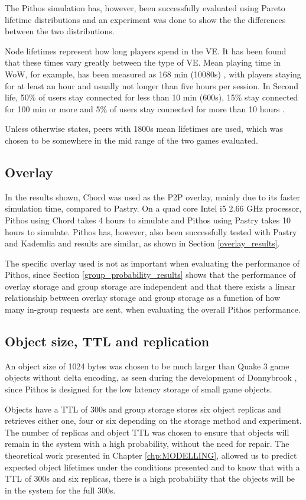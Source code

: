 The Pithos simulation has, however, been successfully evaluated using Pareto lifetime distributions and an experiment was done to show the the differences between the two distributions.

Node lifetimes represent how long players spend in the VE. It has been found that these times vary greatly between the type of VE. Mean playing time in WoW, for example, has been measured as 168 min (10080s) \cite{wow_gameplay_hours}, with players staying for at least an hour and usually not longer than five hours per session. In Second life, 50\% of users stay connected for less than 10 min (600s), 15\% stay connected for 100 min or more and 5\% of users stay connected for more than 10 hours \cite{Varvello_life_in_second_life}.

Unless otherwise states, peers with 1800s mean lifetimes are used, which was chosen to be somewhere in the mid range of the two games evaluated.

\subsection{Overlay}
In the results shown, Chord was used as the P2P overlay, mainly due to its faster simulation time, compared to Pastry. On a quad core Intel i5 2.66 GHz processor, Pithos using Chord takes 4 hours to simulate and Pithos using Pastry takes 10 hours to simulate. Pithos has, however, also been successfully tested with Pastry and Kademlia and results are similar, as shown in Section \ref{overlay_results}.

The specific overlay used is not as important when evaluating the performance of Pithos, since Section \ref{group_probability_results} shows that the performance of overlay storage and group storage are independent and that there exists a linear relationship between overlay storage and group storage as a function of how many in-group requests are sent, when evaluating the overall Pithos performance.

\subsection{Object size, TTL and replication}
An object size of 1024 bytes was chosen to be much larger than Quake 3 game objects without delta encoding, as seen during the development of Donnybrook \cite{Bharambe_Donnybrook}, since Pithos is designed for the low latency storage of small game objects.

Objects have a TTL of 300s and group storage stores six object replicas and retrieves either one, four or six depending on the storage method and experiment. The number of replicas and object TTL was chosen to ensure that objects will remain in the system with a high probability, without the need for repair. The theoretical work presented in Chapter \ref{chp:MODELLING}, allowed us to predict expected object lifetimes under the conditions presented and to know that with a TTL of 300s and six replicas, there is a high probability that the objects will be in the system for the full 300s.

